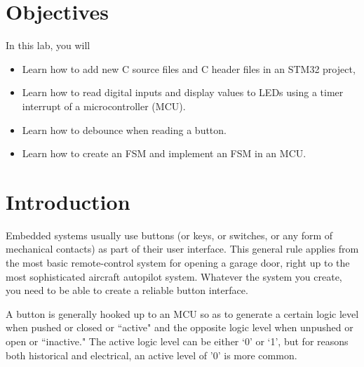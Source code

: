 

\section{Objectives}
In this lab, you will
\begin{itemize}
    \item Learn how to add new C source files and C header files in an STM32 project, 
    \item Learn how to read digital inputs and display values to LEDs using a timer interrupt of a microcontroller (MCU). 
    \item Learn how to debounce when reading a button.
    \item Learn how to create an FSM and implement an FSM in an MCU.
\end{itemize}

\section{Introduction}
Embedded systems usually use buttons (or keys, or switches, or any form of mechanical contacts) as part of their user interface. This general rule applies from the most basic remote-control system for opening a garage door, right up to the most sophisticated aircraft autopilot system. Whatever the system you create, you need to be able to create a reliable button interface. 


A button is generally hooked up to an MCU so as to generate a certain logic level when pushed or closed or ``active" and the opposite logic level when unpushed or open or ``inactive."  The active logic level can be either `0' or `1', but for reasons both historical and electrical, an active level of '0' is more common.

